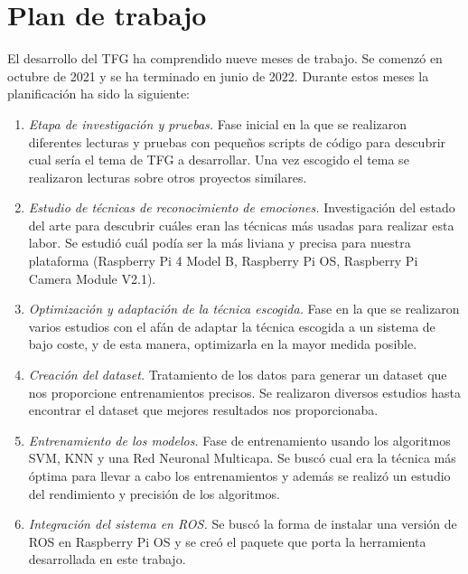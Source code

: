 \section{Plan de trabajo}
\label{sec:plantrabajo}

El desarrollo del TFG ha comprendido nueve meses de trabajo. Se comenzó en octubre de 2021 y se ha terminado en junio de 2022. Durante estos meses la planificación ha sido la siguiente:

\begin{enumerate}
    \item \textit{Etapa de investigación y pruebas.} Fase inicial en la que se realizaron diferentes lecturas y pruebas con pequeños scripts de código para descubrir cual sería el tema de TFG a desarrollar. Una vez escogido el tema se realizaron lecturas sobre otros proyectos similares.
    
    \item \textit{Estudio de técnicas de reconocimiento de emociones.} Investigación del estado del arte para descubrir cuáles eran las técnicas más usadas para realizar esta labor. Se estudió cuál podía ser la más liviana y precisa para nuestra plataforma (Raspberry Pi 4 Model B, Raspberry Pi OS, Raspberry Pi Camera Module V2.1).
    
    \item \textit{Optimización y adaptación de la técnica escogida.} Fase en la que se realizaron varios estudios con el afán de adaptar la técnica escogida a un sistema de bajo coste, y de esta manera, optimizarla en la mayor medida posible.
    
    \item \textit{Creación del dataset.} Tratamiento de los datos para generar un dataset que nos proporcione entrenamientos precisos. Se realizaron diversos estudios hasta encontrar el dataset que mejores resultados nos proporcionaba.
    
    \item \textit{Entrenamiento de los modelos.} Fase de entrenamiento usando los algoritmos SVM, KNN y una Red Neuronal Multicapa. Se buscó cual era la técnica más óptima para llevar a cabo los entrenamientos y además se realizó un estudio del rendimiento y precisión de los algoritmos.
    
    \item \textit{Integración del sistema en ROS.} Se buscó la forma de instalar una versión de ROS en Raspberry Pi OS y se creó el paquete que porta la herramienta desarrollada en este trabajo.
\end{enumerate}
